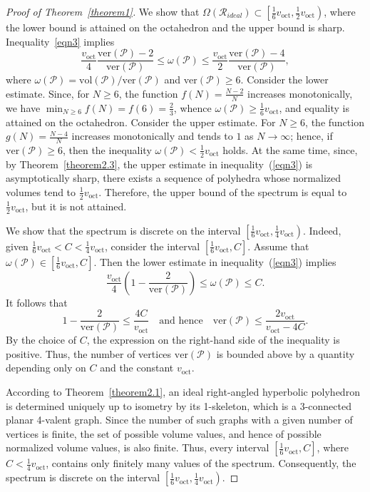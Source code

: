 \documentclass{amsart}
\newcommand{\vol}{\mathrm{vol}}
\newcommand{\voct}{v_{\mathrm{oct}}}
\newcommand{\ver}{\mathrm{ver}}
\begin{document}
\begin{proof}[Proof of Theorem~\ref{theorem1}]
	We show that $\Omega(\mathcal R_{ideal}) \subset \left[ \frac{1}{6} \voct, \frac{1}{2} \voct \right)$, where the lower bound is attained on the octahedron and the upper bound is sharp.
	Inequality~\eqref{eqn3} implies
	$$
	\frac{\voct}{4} \frac{\ver(\mathcal P)-2}{\ver(\mathcal P)} \leq \omega(\mathcal P) \leq \frac{\voct}{2} \frac{\ver(\mathcal P)-4}{\ver(\mathcal P)}, 
	$$
	where $\omega(\mathcal P) = \vol(\mathcal P)/\ver(\mathcal P)$ and $\ver(\mathcal P) \geq 6$.
	Consider the lower estimate. Since, for $N \geq 6$, the function $f(N) = \frac{N-2}{N}$ increases monotonically, we have $\min_{N\geq 6} f(N) = f(6) = \frac{2}{3}$, whence $\omega(\mathcal P) \geq \frac{1}{6} \voct$, and equality is attained on the octahedron.
	Consider the upper estimate. For $N \geq 6$, the function $g(N) = \frac{N-4}{N}$ increases monotonically and tends to $1$ as $N \to \infty$; hence, if $\ver(\mathcal P) \geq 6$, then the inequality $\omega(\mathcal P) < \frac{1}{2} \voct$ holds.
	At the same time, since, by Theorem~\ref{theorem2.3}, the upper estimate in inequality~(\ref{eqn3}) is asymptotically sharp, there exists a sequence of polyhedra whose normalized volumes tend to $\frac{1}{2}\voct$.
	Therefore, the upper bound of the spectrum is equal to $\frac{1}{2}\voct$, but it is not attained.
	
	We show that the spectrum is discrete on the interval $\left[ \frac{1}{6} \voct, \frac{1}{4} \voct \right)$.
	Indeed, given $\frac{1}{6} \voct < C < \frac{1}{4} \voct$, consider the interval $\left[ \frac{1}{6} \voct, C \right]$.
	Assume that $\omega(\mathcal P) \in \left[ \frac{1}{6} \voct, C \right]$.
	Then the lower estimate in inequality~(\ref{eqn3}) implies
	$$
	\frac{\voct}{4} \left(1 - \frac{2}{\ver(\mathcal P)}\right) \leq \omega(\mathcal P) \leq C.
	$$
	It follows that 
	$$
	1 - \frac{2}{\ver(\mathcal P)} \leq \frac{4C}{\voct} \quad \text{and hence} \quad \ver(\mathcal P) \leq \frac{2 \voct}{\voct-4C}.
	$$
	By the choice of $C$, the expression on the right-hand side of the inequality is positive.
	Thus, the number of vertices $\ver(\mathcal P)$ is bounded above by a quantity depending only on $C$ and the constant $\voct$.
	
	According to Theorem~\ref{theorem2.1}, an ideal right-angled hyperbolic polyhedron is determined uniquely up to isometry by its 1-skeleton, which is a 3-connected planar 4-valent graph.
	Since the number of such graphs with a given number of vertices is finite, the set of possible volume values, and hence of possible normalized volume values, is also finite.
	Thus, every interval $\left[ \frac{1}{6} \voct, C \right]$, where $C < \frac{1}{4} \voct$, contains only finitely many values of the spectrum.
	Consequently, the spectrum is discrete on the interval $\left[ \frac{1}{6} \voct, \frac{1}{4} \voct \right)$.


\end{proof}
\end{document}
